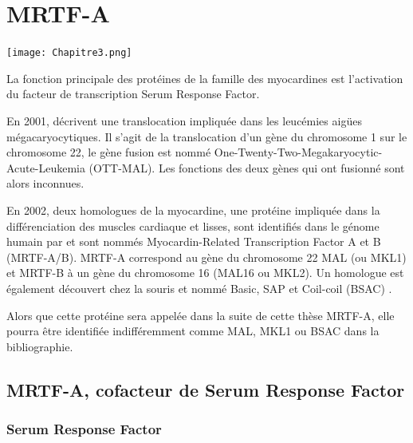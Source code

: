 %
%
%


\chapter{MRTF-A}
\begin{center}
\texttt{[image: Chapitre3.png]}

\end{center}
\newpage
La fonction principale des protéines de la famille des myocardines est l'activation du facteur de transcription Serum Response Factor. 

En 2001, \cite{mercher_involvement_2001} 
décrivent une translocation impliquée dans les leucémies aigües mégacaryocytiques. 
Il s'agit de la translocation d'un gène du chromosome 1 sur le chromosome 22, le gène fusion est nommé One-Twenty-Two-Megakaryocytic-Acute-Leukemia (OTT-MAL). 
Les fonctions des deux gènes qui ont fusionné sont alors inconnues. 

En 2002, deux homologues de la myocardine, une protéine impliquée dans la différenciation des muscles cardiaque et lisses, sont identifiés dans le génome humain par \cite{wang_potentiation_2002} et sont nommés Myocardin-Related Transcription Factor A et B (MRTF-A/B).
MRTF-A correspond au gène du chromosome 22 MAL (ou MKL1) et MRTF-B à un gène du chromosome 16 (MAL16 ou MKL2). 
Un homologue est également découvert chez la souris et nommé Basic, SAP et Coil-coil (BSAC) \parencite{sasazuki_identification_2002}. 

Alors que cette protéine sera appelée dans la suite de cette thèse MRTF-A, elle pourra être identifiée indifféremment comme MAL, MKL1 ou BSAC dans la bibliographie. 

\section{MRTF-A, cofacteur de Serum Response Factor}



\subsection{Serum Response Factor}

